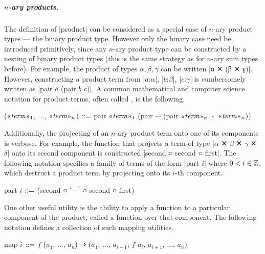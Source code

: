 \subparagraph{$n$-ary products.}
The definition of \code|product| can be considered as a special case of $n$-ary product types --- the binary product type.
However only the binary case need be introduced primitively, since any $n$-ary product type can be constructed by a nesting of binary product types (this is the same strategy as for $n$-ary sum types before).
For example, the product of types $α, β, γ$ can be written \code|α ✕ (β ✕ γ)|.
However, constructing a product term from \code|$a$:$α$|, \code|$b$:$β$|, \code|$c$:$γ$| is cumbersomely written as \code|pair $a$ (pair $b$ $c$)|.
A common mathematical and computer science notation for product terms, often called , is the following.
\begin{notational}[caption={Notation for constructing $n$-ary product terms}]
($\mvar{term}_1$, $\dots$, $\mvar{term}_n$)
  $\syneq$
    pair $\mvar{term}_1$ (pair $\cdots$ (pair $\mvar{term}_{n-1}$ $\mvar{term}_n$))
\end{notational}
Additionally, the projecting of an $n$-ary product term onto one of its components is verbose.
For example, the function that projects a term of type \code|$α$ ✕ $β$ ✕ $γ$ ✕ $δ$| onto its second component is constructed \code|second ○ second ○ first|.
The following notation specifies a family of terms of the form \code|part-$i$| where $0 < i \in \Z$, which destruct a product term by projecting onto its $i$-th component.
\begin{notational}[caption={Notations for destructing $n$-ary product terms}]
part-$i$   $\syneq$   (second ○ $\stackrel{i-1}{\cdots}$ ○ second ○ first)
\end{notational}
One other useful utility is the ability to apply a function to a particular component of the product, called  a function over that component.
The following notation defines a collection of such mapping utilities.
\begin{notational}[caption={Notations for mapping over $n$-ary product terms}]
map-$i$   $\syneq$   $f$ ($a_1$, $\dots$, $a_n$) ⇒ ($a_1$, $\dots$, $a_{i-1}$, $f$ $a_i$, $a_{i+1}$, $\dots$, $a_n$)
\end{notational}

